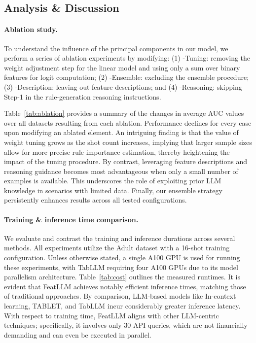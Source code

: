 \subsection{Analysis \& Discussion}
\label{sec:analysis}
\paragraph{Ablation study.} To understand the influence of the principal components in our model, we perform a series of ablation experiments by modifying: (1) \textsf{-Tuning}: removing the weight adjustment step for the linear model and using only a sum over binary features for logit computation; (2) \textsf{-Ensemble}: excluding the ensemble procedure; (3) \textsf{-Description}: leaving out feature descriptions; and (4) \textsf{-Reasoning}: skipping Step-1 in the rule-generation reasoning instructions.

Table~\ref{tab:ablation} provides a summary of the changes in average AUC values over all datasets resulting from each ablation. Performance declines for every case upon modifying an ablated element. An intriguing finding is that the value of weight tuning grows as the shot count increases, implying that larger sample sizes allow for more precise rule importance estimation, thereby heightening the impact of the tuning procedure. By contrast, leveraging feature descriptions and reasoning guidance becomes most advantageous when only a small number of examples is available. This underscores the role of exploiting prior LLM knowledge in scenarios with limited data. Finally, our ensemble strategy persistently enhances results across all tested configurations.

\vspace*{-0.12in}
\paragraph{Training \& inference time comparison.} We evaluate and contrast the training and inference durations across several methods. All experiments utilize the Adult dataset with a 16-shot training configuration. Unless otherwise stated, a single A100 GPU is used for running these experiments, with TabLLM requiring four A100 GPUs due to its model parallelism architecture. Table~\ref{tab:cost} outlines the measured runtimes. It is evident that \textsf{FeatLLM} achieves notably efficient inference times, matching those of traditional approaches. By comparison, LLM-based models like In-context learning, TABLET, and TabLLM incur considerably greater inference latency. With respect to training time, \textsf{FeatLLM} aligns with other LLM-centric techniques; specifically, it involves only 30 API queries, which are not financially demanding and can even be executed in parallel.

